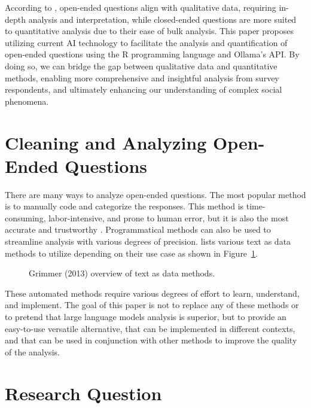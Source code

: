 \documentclass[
  authoryear,
  preprint,
  3p]{elsarticle}
\begin{document}
According to \citet{bickman_rog09}, open-ended questions align with
qualitative data, requiring in-depth analysis and interpretation, while
closed-ended questions are more suited to quantitative analysis due to
their ease of bulk analysis. This paper proposes utilizing current AI
technology to facilitate the analysis and quantification of open-ended
questions using the R programming language and Ollama's API. By doing
so, we can bridge the gap between qualitative data and quantitative
methods, enabling more comprehensive and insightful analysis from survey
respondents, and ultimately enhancing our understanding of complex
social phenomena.

\section{Cleaning and Analyzing Open-Ended
Questions}\label{cleaning-and-analyzing-open-ended-questions}

There are many ways to analyze open-ended questions. The most popular
method is to manually code and categorize the responses. This method is
time-consuming, labor-intensive, and prone to human error, but it is
also the most accurate and trustworthy \citep{roberts_etal14}.
Programmatical methods can also be used to streamline analysis with
various degrees of precision. \citet{grimmer_etal13} lists various text
as data methods to utilize depending on their use case as shown in
Figure~\ref{fig-methods}.

\begin{figure}


\caption{\label{fig-methods}Grimmer (2013) overview of text as data
methods.}

\end{figure}%

These automated methods require various degrees of effort to learn,
understand, and implement. The goal of this paper is not to replace any
of these methods or to pretend that large language models analysis is
superior, but to provide an easy-to-use versatile alternative, that can
be implemented in different contexts, and that can be used in
conjunction with other methods to improve the quality of the analysis.

\section{Research Question}\label{research-question}
\end{document}
